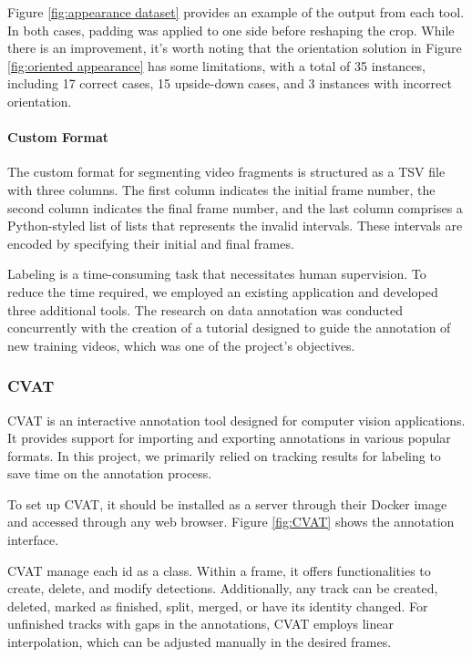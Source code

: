 \needspace{0.2\textheight}

{
    Figure \ref{fig:appearance dataset} provides an example of the output from each tool. 
    In both cases, padding was applied to one side before reshaping the crop.
    While there is an improvement, it's worth noting that the orientation solution in Figure \ref{fig:oriented appearance} has some limitations, 
    with a total of 35 instances, including 17 correct cases, 15 upside-down cases, and 3 instances with incorrect orientation.
}

\FloatBarrier

\paragraph{Custom Format}

{
    The custom format for segmenting video fragments is structured as a \ac{TSV} file with three columns. 
    The first column indicates the initial frame number, 
    the second column indicates the final frame number, 
    and the last column comprises a Python-styled list of lists that represents the invalid intervals. 
    These intervals are encoded by specifying their initial and final frames.
}

{
    Labeling is a time-consuming task that necessitates human supervision. 
    To reduce the time required, we employed an existing application and developed three additional tools.  
    The research on data annotation was conducted concurrently with the creation of a tutorial designed to guide the annotation of new training videos, which was one of the project's objectives.
}

\needspace{0.2\textheight}

\subsubsection{CVAT}

{
    \ac{CVAT}\cite{cvat} is an interactive annotation tool designed for computer vision applications. 
    It provides support for importing and exporting annotations in various popular formats. 
    In this project, we primarily relied on tracking results for labeling to save time on the annotation process.
}

{
    To set up \ac{CVAT}, it should be installed as a server through their Docker image and accessed through any web browser. 
    Figure \ref{fig:CVAT} shows the annotation interface.
}

{
    \ac{CVAT} manage each id as a class. 
    Within a frame, it offers functionalities to create, delete, and modify detections. 
    Additionally, any track can be created, deleted, marked as finished, split, merged, or have its identity changed.
    For unfinished tracks with gaps in the annotations, \ac{CVAT} employs linear interpolation, which can be adjusted manually in the desired frames.
}

